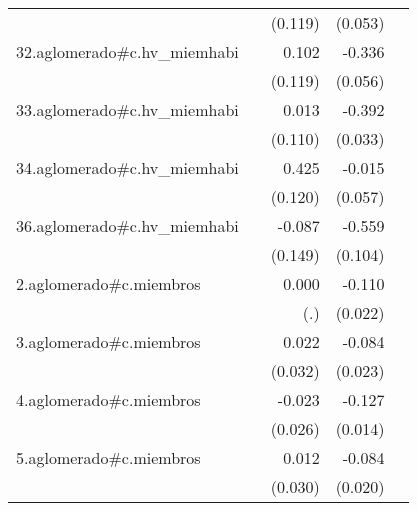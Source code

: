 {\begin{longtable}{l*{4}{D{.}{.}{-1}}}
            &                     &     (0.119)         &     (0.053)         &                     \\
\addlinespace
32.aglomerado#c.hv\_miemhabi&                     &       0.102         &      -0.336\sym{***}&                     \\
            &                     &     (0.119)         &     (0.056)         &                     \\
\addlinespace
33.aglomerado#c.hv\_miemhabi&                     &       0.013         &      -0.392\sym{***}&                     \\
            &                     &     (0.110)         &     (0.033)         &                     \\
\addlinespace
34.aglomerado#c.hv\_miemhabi&                     &       0.425\sym{***}&      -0.015         &                     \\
            &                     &     (0.120)         &     (0.057)         &                     \\
\addlinespace
36.aglomerado#c.hv\_miemhabi&                     &      -0.087         &      -0.559\sym{***}&                     \\
            &                     &     (0.149)         &     (0.104)         &                     \\
\addlinespace
2.aglomerado#c.miembros&                     &       0.000         &      -0.110\sym{***}&                     \\
            &                     &         (.)         &     (0.022)         &                     \\
\addlinespace
3.aglomerado#c.miembros&                     &       0.022         &      -0.084\sym{***}&                     \\
            &                     &     (0.032)         &     (0.023)         &                     \\
\addlinespace
4.aglomerado#c.miembros&                     &      -0.023         &      -0.127\sym{***}&                     \\
            &                     &     (0.026)         &     (0.014)         &                     \\
\addlinespace
5.aglomerado#c.miembros&                     &       0.012         &      -0.084\sym{***}&                     \\
            &                     &     (0.030)         &     (0.020)         &                     \\

\end{longtable}}
